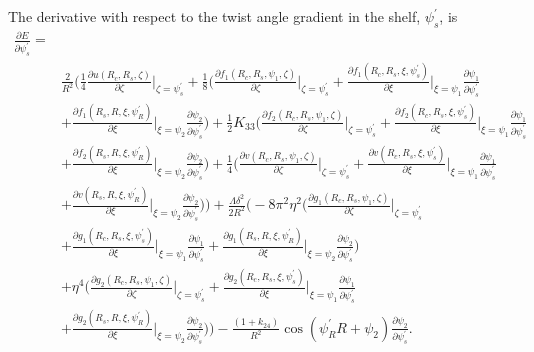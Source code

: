 \documentclass[12pt]{article}
\begin{document}
The derivative with respect to the twist angle gradient in the shelf, $\psi_s^{\prime}$, is
\begin{align}
\frac{\partial E}{\partial \psi_s^{\prime}}=&\nonumber\\
&\frac{2}{R^2}\bigg(\frac{1}{4}\frac{\partial u(R_c,R_s,\zeta)}{\partial\zeta}\bigg|_{\zeta=\psi_s^{\prime}}+\frac{1}{8}\bigg(\frac{\partial f_1(R_c,R_s,\psi_1,\zeta)}{\partial\zeta}\bigg|_{\zeta=\psi_s^{\prime}}+\frac{\partial f_1(R_c,R_s,\xi,\psi_s^{\prime})}{\partial\xi}\bigg|_{\xi=\psi_1}\frac{\partial\psi_1}{\partial\psi_s^{\prime}}\nonumber\\
&+\frac{\partial f_1(R_s,R,\xi,\psi_R^{\prime})}{\partial\xi}\bigg|_{\xi=\psi_2}\frac{\partial\psi_2}{\partial\psi_s^{\prime}}\bigg)+\frac{1}{2}K_{33}\bigg(\frac{\partial f_2(R_c,R_s,\psi_1,\zeta)}{\partial\zeta}\bigg|_{\zeta=\psi_s^{\prime}}+\frac{\partial f_2(R_c,R_s,\xi,\psi_s^{\prime})}{\partial\xi}\bigg|_{\xi=\psi_1}\frac{\partial\psi_1}{\partial\psi_s^{\prime}}\nonumber\\
&+\frac{\partial f_2(R_s,R,\xi,\psi_R^{\prime})}{\partial\xi}\bigg|_{\xi=\psi_2}\frac{\partial\psi_2}{\partial\psi_s^{\prime}}\bigg)+\frac{1}{4}\bigg(\frac{\partial v(R_c,R_s,\psi_1,\zeta)}{\partial\zeta}\bigg|_{\zeta=\psi_s^{\prime}}+\frac{\partial v(R_c,R_s,\xi,\psi_s^{\prime})}{\partial\xi}\bigg|_{\xi=\psi_1}\frac{\partial\psi_1}{\partial\psi_s^{\prime}}\nonumber\\
&+\frac{\partial v(R_s,R,\xi,\psi_R^{\prime})}{\partial\xi}\bigg|_{\xi=\psi_2}\frac{\partial\psi_2}{\partial\psi_s^{\prime}}\bigg)\bigg)+\frac{\Lambda\delta^2}{2R^2}\bigg(-8\pi^2\eta^2\bigg(\frac{\partial g_1(R_c,R_s,\psi_1,\zeta)}{\partial\zeta}\bigg|_{\zeta=\psi_s^{\prime}}\nonumber\\
&+\frac{\partial g_1(R_c,R_s,\xi,\psi_s^{\prime})}{\partial\xi}\bigg|_{\xi=\psi_1}\frac{\partial\psi_1}{\partial\psi_s^{\prime}}+\frac{\partial g_1(R_s,R,\xi,\psi_R^{\prime})}{\partial\xi}\bigg|_{\xi=\psi_2}\frac{\partial\psi_2}{\partial\psi_s^{\prime}}\bigg)\nonumber\\
&+\eta^4\bigg(\frac{\partial g_2(R_c,R_s,\psi_1,\zeta)}{\partial\zeta}\bigg|_{\zeta=\psi_s^{\prime}}+\frac{\partial g_2(R_c,R_s,\xi,\psi_s^{\prime})}{\partial\xi}\bigg|_{\xi=\psi_1}\frac{\partial\psi_1}{\partial\psi_s^{\prime}}\nonumber\\
&+\frac{\partial g_2(R_s,R,\xi,\psi_R^{\prime})}{\partial\xi}\bigg|_{\xi=\psi_2}\frac{\partial\psi_2}{\partial\psi_s^{\prime}}\bigg)\bigg)-\frac{(1+k_{24})}{R^2}\cos(\psi_R^{\prime}R+\psi_2)\frac{\partial\psi_2}{\partial\psi_s^{\prime}}.\label{eq:dEdpsi_sp}
\end{align}
\end{document}
